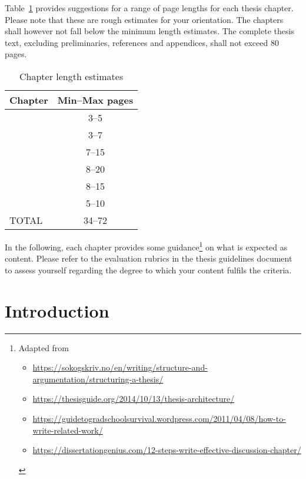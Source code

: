 \documentclass[a4paper,twoside]{bth}
\begin{document}
Table~\ref{tab:pl} provides suggestions for a range of page lengths for each thesis chapter. Please note that these are rough estimates for your orientation. The chapters shall however not fall below the minimum length estimates. The complete thesis text, excluding preliminaries, references and appendices, shall not exceed 80 pages.

\begin{table}[htb]
    \centering
    \begin{tabular}{lc}
        \toprule
        Chapter & Min--Max pages  \\
        \midrule
        \nameref{chp:introduction} & 3--5 \\
        \nameref{chp:relatedwork} & 3--7 \\
        \nameref{chp:method} & 7--15 \\
        \nameref{chp:results} & 8--20 \\
        \nameref{chp:discussion} & 8--15 \\
        \nameref{chp:conclusions} & 5--10 \\
        \midrule
        TOTAL & 34--72 \\
        \bottomrule
    \end{tabular}
    \caption{Chapter length estimates}
    \label{tab:pl}
\end{table}

In the following, each chapter provides some guidance\footnote{Adapted from
\begin{itemize}[nolistsep]
    \item \url{https://sokogskriv.no/en/writing/structure-and-argumentation/structuring-a-thesis/}
    \item \url{https://thesisguide.org/2014/10/13/thesis-architecture/}
    \item \url{https://guidetogradschoolsurvival.wordpress.com/2011/04/08/how-to-write-related-work/}
    \item \url{https://dissertationgenius.com/12-steps-write-effective-discussion-chapter/}
\end{itemize}} on what is expected as content. Please refer to the evaluation rubrics in the thesis guidelines document \cite{guidelines_DP-BTH} to assess yourself regarding the degree to which your content fulfils the criteria.


\chapter{Introduction}
\label{chp:introduction}  %
\end{document}
